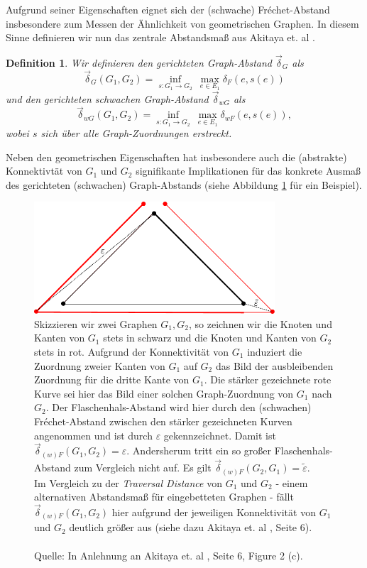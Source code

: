 \documentclass[a4paper, 12pt, twoside]{article}
\theoremstyle{Format1} %
\newtheorem{Def}{Definition}[section]       %
\begin{document}
Aufgrund seiner Eigenschaften eignet sich der (schwache) Fréchet-Abstand insbesondere zum Messen der Ähnlichkeit von geometrischen Graphen. In diesem Sinne definieren wir nun das
zentrale Abstandsmaß aus Akitaya et. al \cite{Akitaya}.

\begin{Def} \label{Definition Graph-Abstand}
	Wir definieren den \textit{gerichteten Graph-Abstand} $ \vec{\delta}_G $ als
	$$ \vec{\delta}_G(G_1,G_2) = \inf_{s: G_1 \to G_2} \: \max_{e \in E_1} \delta_F(e, s(e)) $$
	und den \textit{gerichteten schwachen Graph-Abstand} $ \vec{\delta}_{wG} $ als
	$$  \vec{\delta}_{wG}(G_1,G_2) = \inf_{s: G_1 \to G_2} \: \max_{e \in E_1} {\delta}_{wF}(e, s(e)), $$
	wobei $s$ sich über alle Graph-Zuordnungen erstreckt.
\end{Def}

Neben den geometrischen Eigenschaften hat insbesondere auch die (abstrakte) Konnektivtät von $G_1$ und $G_2$ signifikante
Implikationen für das konkrete Ausmaß des gerichteten (schwachen) Graph-Abstands (siehe Abbildung \ref{chapter_2_example_1} für ein Beispiel).

\begin{figure}[H]
    \centering
    \includegraphics[width=0.8\textwidth]{chapter_2_example_1.pdf}
    \caption{
	    Skizzieren wir zwei Graphen $G_1,G_2$, so zeichnen wir die Knoten und Kanten von $G_1$ stets in schwarz und die Knoten und Kanten von $G_2$ stets in rot.
	    Aufgrund der Konnektivität von $G_1$ induziert die Zuordnung zweier Kanten von $G_1$ auf $G_2$ das Bild der ausbleibenden Zuordnung für die dritte Kante von $G_1$.
	    Die stärker gezeichnete rote Kurve sei hier das Bild einer solchen Graph-Zuordnung von $G_1$ nach $G_2$.
	    Der Flaschenhals-Abstand wird hier durch den (schwachen) Fréchet-Abstand zwischen den stärker gezeichneten Kurven angenommen und ist durch $\varepsilon$ gekennzeichnet.
	    Damit ist $\vec{\delta}_{(w)F}(G_1,G_2) = \varepsilon$.
	    Andersherum tritt ein so großer Flaschenhals-Abstand zum Vergleich nicht auf. Es gilt $\vec{\delta}_{(w)F}(G_2,G_1) = \tilde{\varepsilon}$.
	    \\
	    Im Vergleich zu der \textit{Traversal Distance} von $G_1$ und $G_2$ - einem alternativen Abstandsmaß für eingebetteten Graphen - fällt $\vec{\delta}_{(w)F}(G_1,G_2)$ hier
	    aufgrund der jeweiligen Konnektivität von $G_1$ und $G_2$ deutlich größer aus (siehe dazu Akitaya et. al \cite{Akitaya}, Seite 6).
	    \\
	    \\
	    Quelle: In Anlehnung an Akitaya et. al \cite{Akitaya}, Seite 6, Figure 2 (c).
    }
    \label{chapter_2_example_1}
\end{figure}
\end{document}
